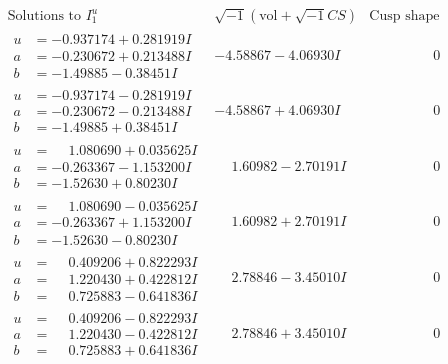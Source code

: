 \documentclass[1p]{elsarticle_modified}
\theoremstyle{definition}
\newcommand{\I}{\sqrt{-1}}
\begin{document}
$$\begin{array}{c|c|c}  
\text{Solutions to }I^u_{1}& \I (\text{vol} + \sqrt{-1}CS) & \text{Cusp shape}\\
 \hline 
\begin{aligned}
u &= -0.937174 + 0.281919 I \\
a &= -0.230672 + 0.213488 I \\
b &= -1.49885 - 0.38451 I\end{aligned}
 & -4.58867 - 4.06930 I & \phantom{-0.000000 } 0 \\ \hline\begin{aligned}
u &= -0.937174 - 0.281919 I \\
a &= -0.230672 - 0.213488 I \\
b &= -1.49885 + 0.38451 I\end{aligned}
 & -4.58867 + 4.06930 I & \phantom{-0.000000 } 0 \\ \hline\begin{aligned}
u &= \phantom{-}1.080690 + 0.035625 I \\
a &= -0.263367 - 1.153200 I \\
b &= -1.52630 + 0.80230 I\end{aligned}
 & \phantom{-}1.60982 - 2.70191 I & \phantom{-0.000000 } 0 \\ \hline\begin{aligned}
u &= \phantom{-}1.080690 - 0.035625 I \\
a &= -0.263367 + 1.153200 I \\
b &= -1.52630 - 0.80230 I\end{aligned}
 & \phantom{-}1.60982 + 2.70191 I & \phantom{-0.000000 } 0 \\ \hline\begin{aligned}
u &= \phantom{-}0.409206 + 0.822293 I \\
a &= \phantom{-}1.220430 + 0.422812 I \\
b &= \phantom{-}0.725883 - 0.641836 I\end{aligned}
 & \phantom{-}2.78846 - 3.45010 I & \phantom{-0.000000 } 0 \\ \hline\begin{aligned}
u &= \phantom{-}0.409206 - 0.822293 I \\
a &= \phantom{-}1.220430 - 0.422812 I \\
b &= \phantom{-}0.725883 + 0.641836 I\end{aligned}
 & \phantom{-}2.78846 + 3.45010 I & \phantom{-0.000000 } 0 \\ \hline\begin{aligned}

\end{aligned}
\end{array}$$
\end{document}
